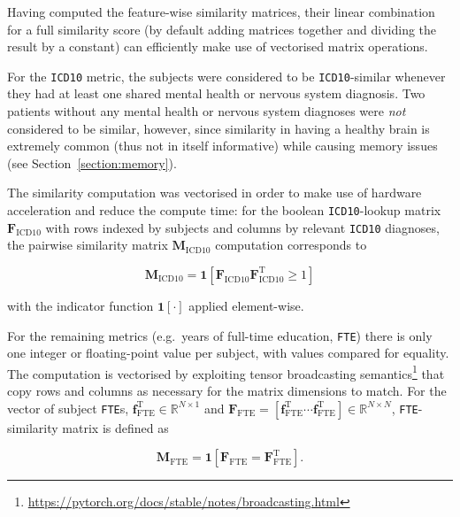 Having computed the feature-wise similarity matrices, their linear combination for a full similarity score (by default adding matrices together and dividing the result by a constant) can efficiently make use of vectorised matrix operations.

For the \texttt{ICD10} metric, the subjects were considered to be \texttt{ICD10}-similar whenever they had at least one shared mental health or nervous system diagnosis. Two patients without any mental health or nervous system diagnoses were \textit{not} considered to be similar, however, since similarity in having a healthy brain is extremely common (thus not in itself informative) while causing memory issues (see Section~\ref{section:memory}). 

The similarity computation was vectorised in order to make use of hardware acceleration and reduce the compute time: for the boolean \texttt{ICD10}-lookup matrix $\mathbf{F}_{\text{ICD10}}$ with rows indexed by subjects and columns by relevant \texttt{ICD10} diagnoses, the pairwise similarity matrix $\mathbf{M}_{\text{ICD10}}$ computation corresponds to 

\begin{equation}
    \mathbf{M}_{\text{ICD10}} = \mathbf{1}\left[\mathbf{F}_{\text{ICD10}}^{\ }\mathbf{F}_{\text{ICD10}}^{\mathrm{T}} \geq 1\right]
\end{equation}

with the indicator function $\mathbf{1}[\cdot]$ applied element-wise.

For the remaining metrics (e.g.\ years of full-time education, \texttt{FTE}) there is only one integer or floating-point value per subject, with values  compared for equality. The computation is vectorised by exploiting tensor broadcasting semantics\footnote{\url{https://pytorch.org/docs/stable/notes/broadcasting.html}} that copy rows and columns as necessary for the matrix dimensions to match. For the vector of subject \texttt{FTE}s, $\mathbf{f}_{\text{FTE}}^{\mathrm{T}} \in \mathbb{R}^{N \times 1}$ and $\mathbf{F}_{\text{FTE}} = [\mathbf{f}_{\text{FTE}}^{\mathrm{T}} \cdots \mathbf{f}_{\text{FTE}}^{\mathrm{T}}] \in \mathbb{R}^{N \times N}$, \texttt{FTE}-similarity matrix is defined as

\begin{equation}
    \mathbf{M}_{\text{FTE}} = \mathbf{1}\left[\mathbf{F}_{\text{FTE}}^{\ } = \mathbf{F}_{\text{FTE}}^{\mathrm{T}} \right].
\end{equation}

